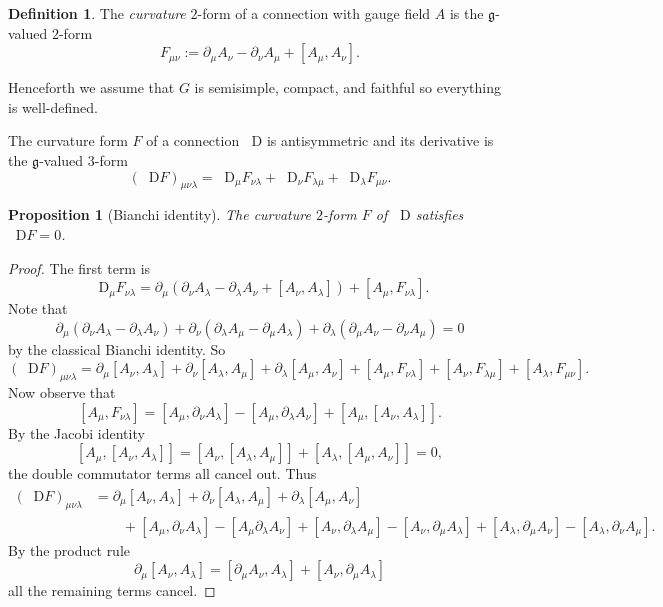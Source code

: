 \documentclass[reqno,11pt]{amsart}
\newcommand*\Dif{\mathop{}\!\mathrm{D}}
\newcommand{\dfn}[1]{\emph{#1}\index{#1}}
\newtheorem{proposition}[theorem]{Proposition}
\theoremstyle{definition}
\newtheorem{definition}[theorem]{Definition}
\numberwithin{equation}{section}
\begin{document}
\begin{definition}
The \dfn{curvature} $2$-form of a connection with gauge field $A$ is the $\mathfrak g$-valued $2$-form
$$F_{\mu \nu} := \partial_\mu A_\nu - \partial_\nu A_\mu + [A_\mu, A_\nu].$$
\end{definition}

Henceforth we assume that $G$ is semisimple, compact, and faithful so everything is well-defined.

The curvature form $F$ of a connection $\Dif$ is antisymmetric and its derivative is the $\mathfrak g$-valued $3$-form
$$(\Dif F)_{\mu \nu \lambda} = \Dif_\mu F_{\nu \lambda} + \Dif_\nu F_{\lambda \mu} + \Dif_\lambda F_{\mu \nu}.$$

\begin{proposition}[Bianchi identity]
The curvature $2$-form $F$ of $\Dif$ satisfies $\Dif F = 0$.
\end{proposition}
\begin{proof}
The first term is 
$$\Dif_\mu F_{\nu \lambda} = \partial_\mu (\partial_\nu A_\lambda - \partial_\lambda A_\nu + [A_\nu, A_\lambda]) + [A_\mu, F_{\nu \lambda}].$$
Note that
$$\partial_\mu (\partial_\nu A_\lambda - \partial_\lambda A_\nu) + \partial_\nu (\partial_\lambda A_\mu - \partial_\mu A_\lambda) + \partial_\lambda (\partial_\mu A_\nu - \partial_\nu A_\mu) = 0$$
by the classical Bianchi identity. So 
$$(\Dif F)_{\mu \nu \lambda} = \partial_\mu [A_\nu, A_\lambda] + \partial_\nu [A_\lambda, A_\mu] + \partial_\lambda [A_\mu, A_\nu] + [A_\mu, F_{\nu \lambda}] + [A_\nu, F_{\lambda \mu}] + [A_\lambda, F_{\mu \nu}].$$
Now observe that 
$$[A_\mu, F_{\nu \lambda}] = [A_\mu, \partial_\nu A_\lambda] - [A_\mu, \partial_\lambda A_\nu] + [A_\mu, [A_\nu, A_\lambda]].$$
By the Jacobi identity
$$[A_\mu, [A_\nu, A_\lambda]] = [A_\nu, [A_\lambda, A_\mu]] + [A_\lambda, [A_\mu, A_\nu]] = 0,$$
the double commutator terms all cancel out.
Thus 
\begin{align*}
(\Dif F)_{\mu \nu \lambda} &= \partial_\mu [A_\nu, A_\lambda] + \partial_\nu [A_\lambda, A_\mu] + \partial_\lambda [A_\mu, A_\nu] \\
&\qquad + [A_\mu, \partial_\nu A_\lambda] - [A_\mu \partial_\lambda A_\nu] + [A_\nu, \partial_\lambda A_\mu] - [A_\nu, \partial_\mu A_\lambda] + [A_\lambda, \partial_\mu A_\nu] - [A_\lambda, \partial_\nu A_\mu].
\end{align*}
By the product rule
$$\partial_\mu [A_\nu, A_\lambda] = [\partial_\mu A_\nu, A_\lambda] + [A_\nu, \partial_\mu A_\lambda]$$
all the remaining terms cancel.
\end{proof}
\end{document}
